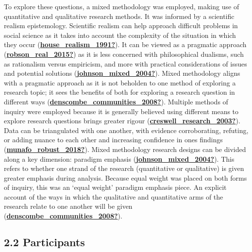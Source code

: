 \documentclass[
]{article}
\begin{document}
To explore these questions, a mixed methodology was employed, making use
of quantitative and qualitative research methods. It was informed by a
scientific realism epistemology. Scientific realism can help approach
difficult problems in social science as it takes into account the
complexity of the situation in which they occur
(\protect\hyperlink{ref-house_realism_1991}{\textbf{house\_realism\_1991?}}).
It can be viewed as a pragmatic approach
(\protect\hyperlink{ref-robson_real_2015}{\textbf{robson\_real\_2015?}})
as it is less concerned with philosophical dualisms, such as rationalism
versus empiricism, and more with practical considerations of issues and
potential solutions
(\protect\hyperlink{ref-johnson_mixed_2004}{\textbf{johnson\_mixed\_2004?}}).
Mixed methodology aligns with a pragmatic approach as it is not beholden
to one method of exploring a research topic; it sees the benefits of
both for exploring a research question in different ways
(\protect\hyperlink{ref-denscombe_communities_2008}{\textbf{denscombe\_communities\_2008?}}).
Multiple methods of inquiry were employed because it is generally
believed using different means to explore research questions brings
greater rigour
(\protect\hyperlink{ref-creswell_research_2003}{\textbf{creswell\_research\_2003?}}).
Data can be triangulated with one another, with evidence corroborating,
refuting, or adding nuance to each other and increasing confidence in
ones findings
(\protect\hyperlink{ref-munafo_robust_2018}{\textbf{munafo\_robust\_2018?}}).
Mixed methodology research designs can be divided along a key dimension:
paradigm emphasis
(\protect\hyperlink{ref-johnson_mixed_2004}{\textbf{johnson\_mixed\_2004?}}).
This refers to whether one strand of the research (quantitative or
qualitative) is given greater emphasis during analysis. Because equal
weight was placed on both forms of inquiry, this was an `equal weight'
paradigm emphasis piece. An explicit account of the ways in which the
qualitative and quantitative arms of the research relate to one another
will be given
(\protect\hyperlink{ref-denscombe_communities_2008}{\textbf{denscombe\_communities\_2008?}}).

\hypertarget{participants}{%
\subsection{2.2 Participants}\label{participants}}
\end{document}
